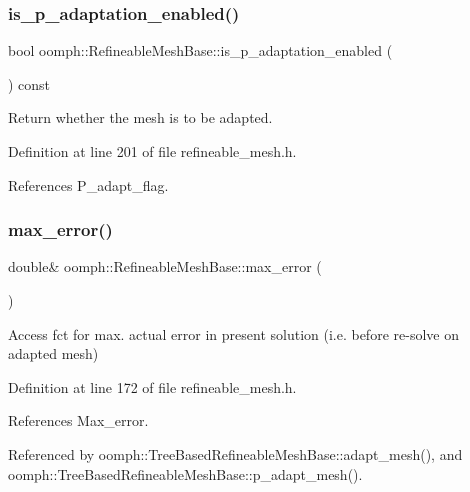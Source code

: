 \subsubsection{\texorpdfstring{is\+\_\+p\+\_\+adaptation\+\_\+enabled()}{is\_p\_adaptation\_enabled()}}
{\footnotesize\ttfamily bool oomph\+::\+Refineable\+Mesh\+Base\+::is\+\_\+p\+\_\+adaptation\+\_\+enabled (\begin{DoxyParamCaption}{ }\end{DoxyParamCaption}) const\hspace{0.3cm}{\ttfamily [inline]}}



Return whether the mesh is to be adapted. 



Definition at line 201 of file refineable\+\_\+mesh.\+h.



References P\+\_\+adapt\+\_\+flag.

\mbox{\label{classoomph_1_1RefineableMeshBase_a8d7689918a098ce597c3d4fc716a0727}} 
\subsubsection{\texorpdfstring{max\+\_\+error()}{max\_error()}}
{\footnotesize\ttfamily double\& oomph\+::\+Refineable\+Mesh\+Base\+::max\+\_\+error (\begin{DoxyParamCaption}{ }\end{DoxyParamCaption})\hspace{0.3cm}{\ttfamily [inline]}}



Access fct for max. actual error in present solution (i.\+e. before re-\/solve on adapted mesh) 



Definition at line 172 of file refineable\+\_\+mesh.\+h.



References Max\+\_\+error.



Referenced by oomph\+::\+Tree\+Based\+Refineable\+Mesh\+Base\+::adapt\+\_\+mesh(), and oomph\+::\+Tree\+Based\+Refineable\+Mesh\+Base\+::p\+\_\+adapt\+\_\+mesh().

